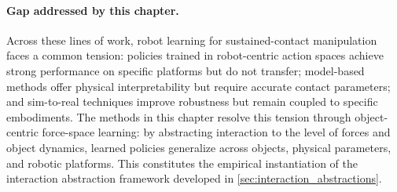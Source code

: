 \paragraph{Gap addressed by this chapter.}
Across these lines of work, robot learning for sustained-contact manipulation faces a common tension: policies trained in robot-centric action spaces achieve strong performance on specific platforms but do not transfer; model-based methods offer physical interpretability but require accurate contact parameters; and sim-to-real techniques improve robustness but remain coupled to specific embodiments. The methods in this chapter resolve this tension through object-centric force-space learning: by abstracting interaction to the level of forces and object dynamics, learned policies generalize across objects, physical parameters, and robotic platforms. This constitutes the empirical instantiation of the interaction abstraction framework developed in \cref{sec:interaction_abstractions}.